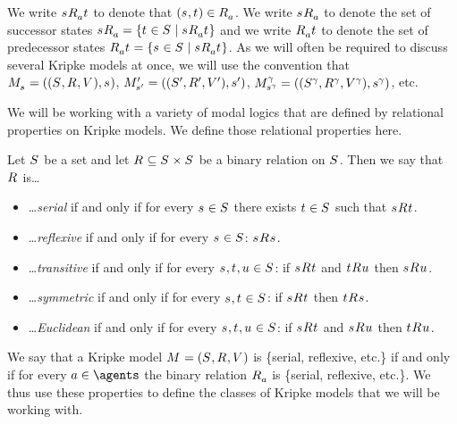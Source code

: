 We write $\stateS \accessibility{\agentA} \stateT$ to denote that $(\stateS, \stateT) \in \accessibility{\agentA}$.
We write $\successors{\agentA}{\stateS}$ to denote the set of successor states $\successors{\agentA}{\stateS} = \{\stateT \in \states \mid \stateS \accessibility{\agentA} \stateT\}$ and
we write $\predecessors{\agentA}{\stateT}$ to denote the set of predecessor states $\predecessors{\agentA}{\stateT} = \{\stateS \in \states \mid \stateS \accessibility{\agentA} \stateT\}$.
As we will often be required to discuss several Kripke models at once, we will use the convention that $\pointedModelAndTuple{\stateS}$, $\pointedModelAndTuple[\prime]{\stateS[\prime]}$, $\pointedModelAndTuple[\gamma]{\stateS[\gamma]}$, etc.

We will be working with a variety of modal logics that are defined by relational properties on Kripke models.
We define those relational properties here.

\begin{definition}
Let $\states$ be a set and let $\accessibilityRel \subseteq \states \times \states$ be a binary relation on $\states$. 
Then we say that $\accessibilityRel$ is\ldots
\begin{itemize}
    \item \ldots {\em serial} if and only if for every $\stateS \in \states$ there exists $\stateT \in \states$ such that $\stateS \accessibility{} \stateT$.
    \item \ldots {\em reflexive} if and only if for every $\stateS \in \states$: $\stateS \accessibility{} \stateS$.
    \item \ldots {\em transitive} if and only if for every $\stateS, \stateT, \stateU \in \states$: if $\stateS \accessibility{} \stateT$ and $\stateT \accessibility{} \stateU$ then $\stateS \accessibility{} \stateU$.
    \item \ldots {\em symmetric} if and only if for every $\stateS, \stateT \in \states$: if $\stateS \accessibility{} \stateT$ then $\stateT \accessibility{} \stateS$.
    \item \ldots {\em Euclidean} if and only if for every $\stateS, \stateT, \stateU \in \states$: if $\stateS \accessibility{} \stateT$ and $\stateS \accessibility{} \stateU$ then $\stateT \accessibility{} \stateU$.
\end{itemize}
\end{definition}

We say that a Kripke model $\modelAndTuple$ is \{serial, reflexive, etc.\} if and only if for every $\agentA \in \agents$ the binary relation $\accessibility{\agentA}$ is \{serial, reflexive, etc.\}.
We thus use these properties to define the classes of Kripke models that we will be working with.

